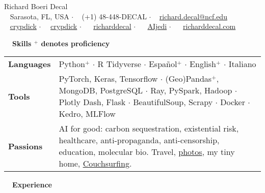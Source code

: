 \documentclass[a4paper,12pt]{article}
\newcommand{\resheading}[1]{{\vspace*{.001in} \colorbox{mygrey}{\begin{minipage}{\textwidth}{\textmd{\large \textbf{#1} \vphantom{p\^{E}}}}\end{minipage}}} }
\newcommand{\ressubheading}[4]{
        \textbf{#1} \hfill #2\\
        \textit{#3} \hfill #4 \\}
\begin{document}
\begin{center}
{\Huge Richard Boeri Decal} \\
{\small \faMapMarker~ Sarasota, FL, USA $\cdot$ \faPhone~ (+1) 48-448-DECAL $\cdot$ \faEnvelope~ \href{mailto:richard.decal@ncf.edu}{richard.decal@ncf.edu}  \\ \faGithubAlt~ \href{https://github.com/crypdick}{crypdick} $\cdot$~\faStackOverflow~  \href{https://stackoverflow.com/users/4212158/crypdick}{crypdick} $\cdot$ ~\faLinkedin~ \href{https://www.linkedin.com/in/richarddecal/}{richarddecal}  $\cdot$ ~\faTwitter~ \href{https://twitter.com/AIjedi}{AIjedi}  $\cdot$ ~\faHome~  \href{http://www.richarddecal.com}{richarddecal.com}}
\end{center}

\resheading{~~Skills \hfill {\small$^+$ denotes proficiency}}
\vspace{-1em}
\begin{tabularx}{\textwidth}{p{2.1cm}>{\arraybackslash}X}
  \bfseries{Languages} & Python$^+$ $\cdot$ R Tidyverse $\cdot$ Espa\~nol$^+$ $\cdot$ English$^+$ $\cdot$ Italiano \\  %
  \bfseries{Tools} & PyTorch, Keras, Tensorflow  $\cdot$ (Geo)Pandas$^+$, \mbox{MongoDB}, PostgreSQL $\cdot$ Ray, PySpark, Hadoop $\cdot$ Plotly Dash, Flask  $\cdot$ BeautifulSoup, Scrapy $\cdot$ Docker $\cdot$ Kedro, MLFlow  \\
  \bfseries{Passions} & AI for good: carbon sequestration, existential risk, healthcare, anti-propaganda, anti-censorship, education, molecular bio. Travel, \href{https://www.flickr.com/photos/richarddecal/sets/72157640025469005/}{photos}, my tiny home, \href{https://www.couchsurfing.com/people/rovingrichard/references}{Couchsurfing}.
\end{tabularx}


\resheading{~~Experience}
\vspace{-1em}
\end{document}
